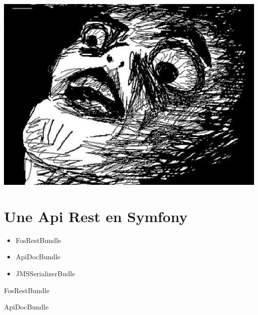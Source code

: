\documentclass[12pt, francais]{beamer}
\begin{document}
\begin{frame}
	
	\pause
	\vspace*{-6cm}
	\begin{center}
		\includegraphics[width=.5\linewidth]{Pictures/OhCrap.png}
	\end{center}
\end{frame}


\section{Une Api Rest en Symfony}

\begin{frame}
\end{frame}


\begin{frame}
	\begin{itemize}
	\centering
		\item FosRestBundle
		\item ApiDocBundle
		\item JMSSerializerBudle
	\end{itemize}
\end{frame}

\begin{frame}{FosRestBundle}
	
\end{frame}


\begin{frame}{ApiDocBundle}
	
\end{frame}
\end{document}
